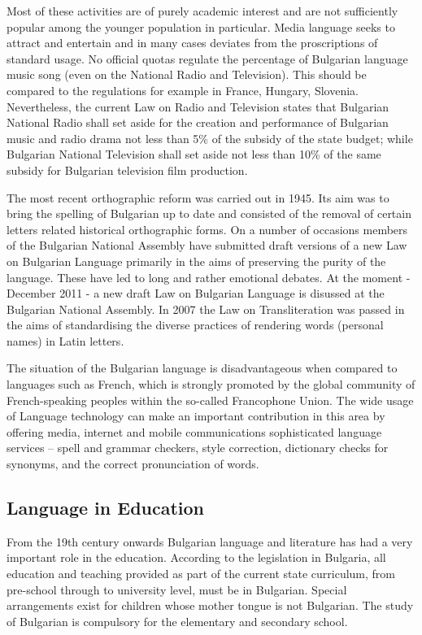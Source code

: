 \documentclass[]{../../metanetpaper}
\begin{document}
\begin{multicols}{2}
Most of these activities are of purely academic interest and are not sufficiently popular among the younger population in particular. Media language seeks to attract and entertain and in many cases deviates from the proscriptions of standard usage. No official quotas regulate the percentage of Bulgarian language music song (even on the National Radio and Television). This should be compared to the regulations for example in France, Hungary, Slovenia. Nevertheless, the current Law on Radio and Television states that Bulgarian National Radio shall set aside for the creation and performance of Bulgarian music and radio drama not less than 5\% of the subsidy of the state budget; while Bulgarian National Television shall set aside not less than 10\% of the same subsidy for Bulgarian television film production. 

The most recent orthographic reform was carried out in 1945. Its aim was to bring the spelling of Bulgarian up to date and consisted of the removal of certain letters related historical orthographic forms. On a number of occasions members of the Bulgarian National Assembly have submitted draft versions of a new Law on Bulgarian Language primarily in the aims of preserving the purity of the language. These have led to long and rather emotional debates. At the moment - December 2011 - a new draft Law on Bulgarian Language is disussed at the Bulgarian National Assembly.  In 2007 the Law on Transliteration was passed in the aims of standardising the diverse practices of rendering words (personal names) in Latin letters.

The situation of the Bulgarian language is disadvantageous when compared to languages such as French, which is strongly promoted by the global community of French-speaking peoples within the so-called Francophone Union. The wide usage of Language technology can make an important contribution in this area by offering media, internet and mobile communications sophisticated language services -- spell and grammar checkers, style correction, dictionary checks for synonyms, and the correct pronunciation of words.

\subsection{Language in Education}

From the 19th century onwards Bulgarian language and literature has had a very important role in the education. According to the legislation in Bulgaria, all education and teaching provided as part of the current state curriculum, from pre-school through to university level, must be in Bulgarian. Special arrangements exist for children whose mother tongue is not Bulgarian. The study of Bulgarian is compulsory for the elementary and secondary school.


\end{multicols}
\end{document}
